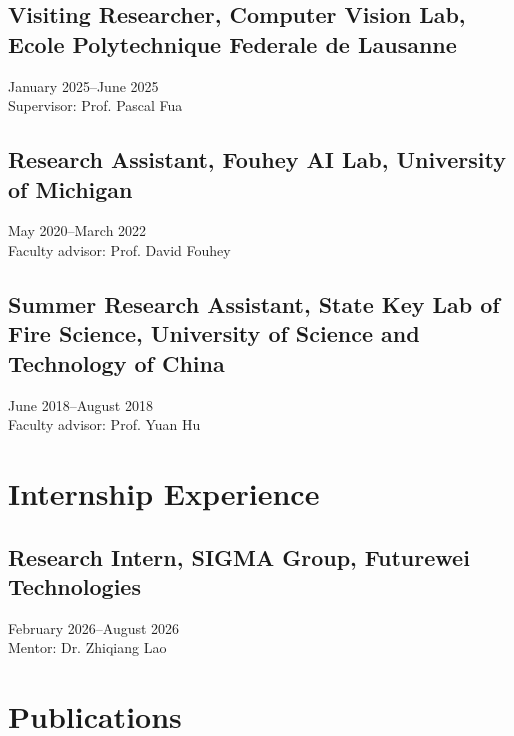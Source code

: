 \documentclass[11pt,letterpaper]{article}
\begin{document}
\subsection{Visiting Researcher, Computer Vision Lab, Ecole Polytechnique Federale de Lausanne}
January 2025--June 2025\\
Supervisor: Prof. Pascal Fua
\subsection{Research Assistant, Fouhey AI Lab, University of Michigan}
May 2020--March 2022\\
Faculty advisor: Prof. David Fouhey
\subsection{Summer Research Assistant, State Key Lab of Fire Science, University of Science and Technology of China}
June 2018--August 2018\\
Faculty advisor: Prof. Yuan Hu
\section{Internship Experience}

\subsection{Research Intern, SIGMA Group, Futurewei Technologies}
February 2026--August 2026\\
Mentor: Dr. Zhiqiang Lao
\newpage
\section{Publications}
\end{document}
